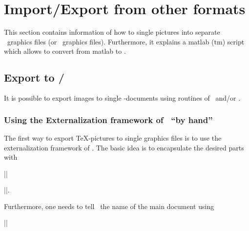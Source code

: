 \section{Import/Export from other formats}
\label{sec:pgfplots:importexport}
This section contains information of how to single pictures into separate \pdf\ graphics files (or \eps\ graphics files). Furthermore, it explains a matlab (tm) script which allows to convert from matlab to \PGFPlots.

\subsection{Export to \pdf/\eps}
It is possible to export images to single \pdf-documents using routines of \pgfname\ and/or \Tikz.

\subsubsection{Using the Externalization framework of \pgfname\ ``by hand''}
The first way to export \TeX-pictures to single graphics files is to use the externalization framework of \pgfname.
The basic idea is to encapsulate the desired parts with

|\beginpgfgraphicnamed|


|\endpgfgraphicnamed|. 

\noindent Furthermore, one needs to tell \pgfname\ the name of the main document using

|\pgfrealjobname|

